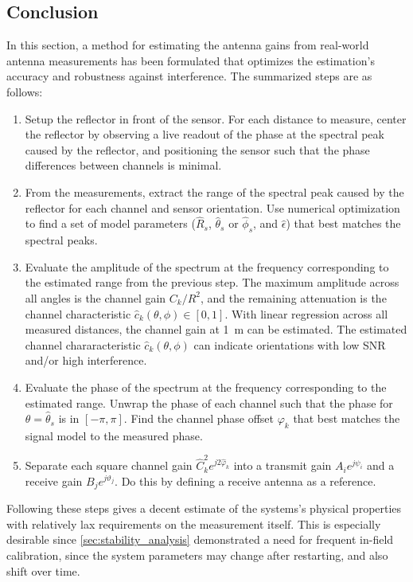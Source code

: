 \subsection{Conclusion}
In this section, a method for estimating the antenna gains from real-world antenna measurements has been formulated
that optimizes the estimation's accuracy and robustness against interference.
The summarized steps are as follows:
\begin{enumerate}
  \item Setup the reflector in front of the sensor.
        For each distance to measure, center the reflector by observing a live readout of the phase at the spectral peak caused by the reflector,
        and positioning the sensor such that the phase differences between channels is minimal.
  \item From the measurements, extract the range of the spectral peak caused by the reflector for each channel and sensor orientation.
        Use numerical optimization to find a set of model parameters ($\hat R_s$, $\hat \theta_s$ or $\hat \phi_s$, and $\hat\epsilon$)
        that best matches the spectral peaks.
  \item Evaluate the amplitude of the spectrum at the frequency corresponding to the estimated range from the previous step.
        The maximum amplitude across all angles is the channel gain $C_k / R^2$,
        and the remaining attenuation is the channel characteristic $\hat c_k(\theta,\phi) \in [0,1]$.
        With linear regression across all measured distances, the channel gain at \SI{1}{\m} can be estimated.
        The estimated channel chararacteristic $\hat c_k(\theta,\phi)$ can indicate orientations with low SNR and/or high interference.
  \item Evaluate the phase of the spectrum at the frequency corresponding to the estimated range.
        Unwrap the phase of each channel such that the phase for $\theta = \hat \theta_s$ is in $[-\pi,\pi]$.
        Find the channel phase offset $\varphi_k$ that best matches the signal model to the measured phase.
  \item Separate each square channel gain $\hat C_k^2e^{j2\hat \varphi_k}$ into a transmit gain $A_i e^{j\psi_i}$ and a receive gain $B_j e^{j\vartheta_j}$.
        Do this by defining a receive antenna as a reference.
\end{enumerate}

Following these steps gives a decent estimate of the systems's physical properties with relatively lax requirements on the measurement itself.
This is especially desirable since \cref{sec:stability_analysis} demonstrated a need for frequent in-field calibration,
since the system parameters may change after restarting, and also shift over time. \\

